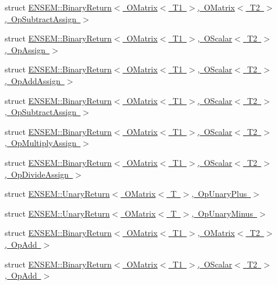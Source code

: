 \begin{DoxyCompactItemize}
\item 
struct \mbox{\hyperlink{structENSEM_1_1BinaryReturn_3_01OMatrix_3_01T1_01_4_00_01OMatrix_3_01T2_01_4_00_01OpSubtractAssign_01_4}{E\+N\+S\+E\+M\+::\+Binary\+Return$<$ O\+Matrix$<$ T1 $>$, O\+Matrix$<$ T2 $>$, Op\+Subtract\+Assign $>$}}
\item 
struct \mbox{\hyperlink{structENSEM_1_1BinaryReturn_3_01OMatrix_3_01T1_01_4_00_01OScalar_3_01T2_01_4_00_01OpAssign_01_4}{E\+N\+S\+E\+M\+::\+Binary\+Return$<$ O\+Matrix$<$ T1 $>$, O\+Scalar$<$ T2 $>$, Op\+Assign $>$}}
\item 
struct \mbox{\hyperlink{structENSEM_1_1BinaryReturn_3_01OMatrix_3_01T1_01_4_00_01OScalar_3_01T2_01_4_00_01OpAddAssign_01_4}{E\+N\+S\+E\+M\+::\+Binary\+Return$<$ O\+Matrix$<$ T1 $>$, O\+Scalar$<$ T2 $>$, Op\+Add\+Assign $>$}}
\item 
struct \mbox{\hyperlink{structENSEM_1_1BinaryReturn_3_01OMatrix_3_01T1_01_4_00_01OScalar_3_01T2_01_4_00_01OpSubtractAssign_01_4}{E\+N\+S\+E\+M\+::\+Binary\+Return$<$ O\+Matrix$<$ T1 $>$, O\+Scalar$<$ T2 $>$, Op\+Subtract\+Assign $>$}}
\item 
struct \mbox{\hyperlink{structENSEM_1_1BinaryReturn_3_01OMatrix_3_01T1_01_4_00_01OScalar_3_01T2_01_4_00_01OpMultiplyAssign_01_4}{E\+N\+S\+E\+M\+::\+Binary\+Return$<$ O\+Matrix$<$ T1 $>$, O\+Scalar$<$ T2 $>$, Op\+Multiply\+Assign $>$}}
\item 
struct \mbox{\hyperlink{structENSEM_1_1BinaryReturn_3_01OMatrix_3_01T1_01_4_00_01OScalar_3_01T2_01_4_00_01OpDivideAssign_01_4}{E\+N\+S\+E\+M\+::\+Binary\+Return$<$ O\+Matrix$<$ T1 $>$, O\+Scalar$<$ T2 $>$, Op\+Divide\+Assign $>$}}
\item 
struct \mbox{\hyperlink{structENSEM_1_1UnaryReturn_3_01OMatrix_3_01T_01_4_00_01OpUnaryPlus_01_4}{E\+N\+S\+E\+M\+::\+Unary\+Return$<$ O\+Matrix$<$ T $>$, Op\+Unary\+Plus $>$}}
\item 
struct \mbox{\hyperlink{structENSEM_1_1UnaryReturn_3_01OMatrix_3_01T_01_4_00_01OpUnaryMinus_01_4}{E\+N\+S\+E\+M\+::\+Unary\+Return$<$ O\+Matrix$<$ T $>$, Op\+Unary\+Minus $>$}}
\item 
struct \mbox{\hyperlink{structENSEM_1_1BinaryReturn_3_01OMatrix_3_01T1_01_4_00_01OMatrix_3_01T2_01_4_00_01OpAdd_01_4}{E\+N\+S\+E\+M\+::\+Binary\+Return$<$ O\+Matrix$<$ T1 $>$, O\+Matrix$<$ T2 $>$, Op\+Add $>$}}
\item 
struct \mbox{\hyperlink{structENSEM_1_1BinaryReturn_3_01OMatrix_3_01T1_01_4_00_01OScalar_3_01T2_01_4_00_01OpAdd_01_4}{E\+N\+S\+E\+M\+::\+Binary\+Return$<$ O\+Matrix$<$ T1 $>$, O\+Scalar$<$ T2 $>$, Op\+Add $>$}}

\end{DoxyCompactItemize}

